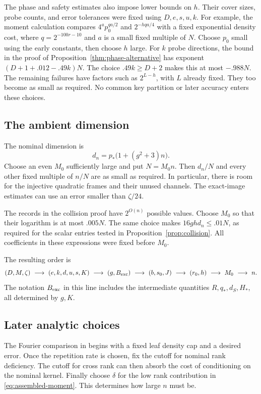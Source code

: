 The phase and safety estimates also impose lower bounds on \(h\).
Their cover sizes, probe counts, and error tolerances were fixed using
\(D,e,s,u,k\). For example, the moment calculation compares
\(4^a p_0^{qa/2}\) and \(2^{-hqa/4}\) with a fixed exponential density
cost, where \(q=2^{-100r-10}\) and \(a\) is a small fixed multiple of \(N\).
Choose \(p_0\) small using the early constants, then choose \(h\) large.
For \(k\) probe directions, the bound in the proof of
Proposition~\ref{thm:phase-alternative} has exponent
\((D+1+.012-.49k)N\). The choice \(.49k\ge D+2\) makes this at
most \(-.988N\). The remaining failures have factors
such as \(2^{L-h}\), with \(L\) already fixed. They too become as small
as required. No common key partition or later accuracy enters these
choices.

\subsection{The ambient dimension}

The nominal dimension is
\[
 d_n=p_*\bigl(1+(g^2+3)n\bigr).
\]
Choose an even \(M_0\) sufficiently large and put \(N=M_0n\).
Then \(d_n/N\) and every other fixed multiple of \(n/N\) are as small
as required. In particular, there is room for the injective quadratic
frames and their unused channels. The exact-image estimates can use an
error smaller than \(\zeta/24\).

The records in the collision proof have \(2^{O(n)}\) possible values.
Choose \(M_0\) so that their logarithm is at most \(.005N\). The same
choice makes \(16ghd_n\le .01N\), as required for the scalar entries
tested in Proposition~\ref{prop:collision}. All coefficients in these expressions
were fixed before \(M_0\).

The resulting order is
\[
 (D,M,\zeta)\ \longrightarrow\ (e,k,d,u,s,K)
 \ \longrightarrow\ (g,B_{\rm exc})
 \ \longrightarrow\ (b,s_0,J)
 \ \longrightarrow\ (r_0,h)
 \ \longrightarrow\ M_0\ \longrightarrow\ n.
\]
The notation \(B_{\rm exc}\) in this line includes the intermediate
quantities \(R,q_*,d_S,H_*\), all determined by \(g,K\).

\subsection{Later analytic choices}

The Fourier comparison in  begins with a fixed
leaf density cap and a desired error. Once the repetition rate is chosen,
fix the cutoff for nominal rank deficiency. The cutoff for cross rank
can then absorb the cost of conditioning on the nominal kernel.
Finally choose \(\delta\) for the low rank contribution in
\eqref{eq:assembled-moment}. This determines how large \(n\) must be.

